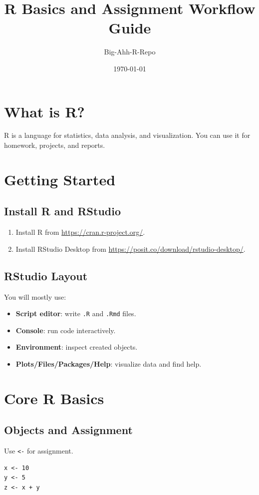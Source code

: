 \documentclass[11pt]{article}
\title{R Basics and Assignment Workflow Guide}
\author{Big-Ahh-R-Repo}
\date{\today}
\begin{document}
\maketitle
\tableofcontents
\newpage

\section{What is R?}
R is a language for statistics, data analysis, and visualization. You can use it for homework, projects, and reports.

\section{Getting Started}
\subsection{Install R and RStudio}
\begin{enumerate}[leftmargin=*]
  \item Install R from \url{https://cran.r-project.org/}.
  \item Install RStudio Desktop from \url{https://posit.co/download/rstudio-desktop/}.
\end{enumerate}

\subsection{RStudio Layout}
You will mostly use:
\begin{itemize}[leftmargin=*]
  \item \textbf{Script editor}: write \texttt{.R} and \texttt{.Rmd} files.
  \item \textbf{Console}: run code interactively.
  \item \textbf{Environment}: inspect created objects.
  \item \textbf{Plots/Files/Packages/Help}: visualize data and find help.
\end{itemize}

\section{Core R Basics}
\subsection{Objects and Assignment}
Use \texttt{<-} for assignment.
\begin{verbatim}
x <- 10
y <- 5
z <- x + y
\end{verbatim}
\end{document}
